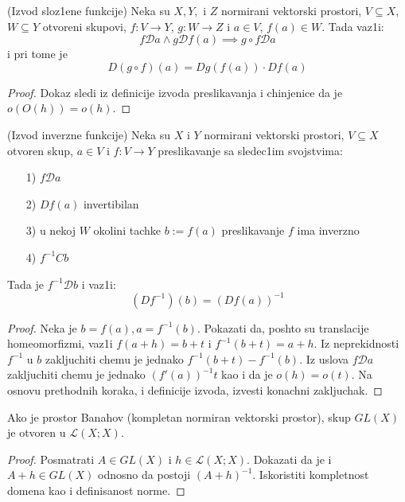 \documentclass[a4paper,12pt]{article}
\newcommand{\psj}{\subseteq}
\begin{document}
\begin{tma}(Izvod sloz1ene funkcije)
Neka su $X, Y,$ i $Z$ normirani vektorski prostori, $V \psj X$, $W \psj Y$ otvoreni skupovi, $f: V \to Y$, $g: W \to Z$ i $a \in V$, $f(a) \in W$. Tada vaz1i:
\[f\mathcal{D} a \wedge g \mathcal{D} f(a) \implies g\circ f \mathcal{D} a\]
i pri tome je
\[D(g \circ f) (a) = Dg(f(a))\cdot Df(a) \]
\end{tma}
\begin{proof}
Dokaz sledi iz definicije izvoda preslikavanja i chinjenice da je $o(O(h)) = o(h)$.
\end{proof}

\begin{tma}(Izvod inverzne funkcije)
Neka su $X$ i $Y$ normirani vektorski prostori, $V \psj X$ otvoren skup, $a\in V$ i $f: V \to Y$ preslikavanje sa sledec1im svojstvima:
\begin{itemize}
\item[1)] $f \mathcal{D} a$
\item[2)] $Df(a)$ invertibilan
\item[3)] u nekoj $W$ okolini tachke $b := f(a)$ preslikavanje $f$ ima inverzno
\item[4)] $f^{-1} C b$
\end{itemize}
Tada je $f^{-1} \mathcal{D} b$ i vaz1i:
\[(Df^{-1})(b) = {(Df(a))}^{-1}\]
\end{tma}
\begin{proof}
Neka je $b = f(a), a = f^{-1}(b)$. Pokazati da, poshto su translacije homeomorfizmi, vaz1i $f(a+h) = b+t$ i $f^{-1}(b+t) = a+h$. Iz neprekidnosti $f^{-1}$ u $b$ zakljuchiti chemu je jednako $f^{-1} (b+t) - f^{-1}(b)$. Iz uslova $f \mathcal{D} a$ zakljuchiti chemu je jednako ${(f'(a))}^{-1} t$ kao i da je $o(h) = o(t)$. Na osnovu prethodnih koraka, i definicije izvoda, izvesti konachni zakljuchak.
\end{proof}

\begin{tvr}
Ako je prostor Banahov (kompletan normiran vektorski prostor), skup $GL(X)$ je otvoren u $\mathcal{L}(X;X)$.
\end{tvr}
\begin{proof}
Posmatrati $A \in GL(X)$ i $h \in \mathcal{L} (X;X)$. Dokazati da je i $A+h \in GL(X)$ odnosno da postoji ${(A+h)}^{-1}$. Iskoristiti kompletnost domena kao i definisanost norme.
\end{proof}
\end{document}
